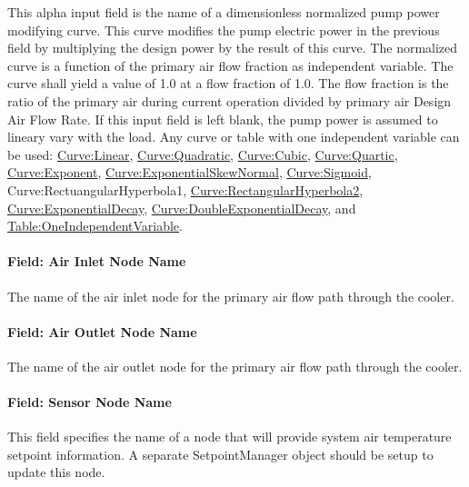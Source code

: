 This alpha input field is the name of a dimensionless normalized pump power modifying curve. This curve modifies the pump electric power in the previous field by multiplying the design power by the result of this curve. The normalized curve is a function of the primary air flow fraction as independent variable. The curve shall yield a value of 1.0 at a flow fraction of 1.0. The flow fraction is the ratio of the primary air during current operation divided by primary air Design Air Flow Rate. If this input field is left blank, the pump power is assumed to lineary vary with the load. Any curve or table with one independent variable can be used: \hyperref[curvelinear]{Curve:Linear}, \hyperref[curvequadratic]{Curve:Quadratic}, \hyperref[curvecubic]{Curve:Cubic}, \hyperref[curvequartic]{Curve:Quartic}, \hyperref[curveexponent]{Curve:Exponent}, \hyperref[curveexponentialskewnormal]{\hyperref[curveexponent]{Curve:Exponent}ialSkewNormal}, \hyperref[curvesigmoid]{Curve:Sigmoid}, Curve:RectuangularHyperbola1, \hyperref[curverectangularhyperbola2]{Curve:RectangularHyperbola2}, \hyperref[curveexponentialdecay]{\hyperref[curveexponent]{Curve:Exponent}ialDecay}, \hyperref[curvedoubleexponentialdecay]{Curve:DoubleExponentialDecay}, and \hyperref[tableoneindependentvariable]{Table:OneIndependentVariable}.

\paragraph{Field: Air Inlet Node Name}\label{field-air-inlet-node-name-1-001}

The name of the air inlet node for the primary air flow path through the cooler.

\paragraph{Field: Air Outlet Node Name}\label{field-air-outlet-node-name-1-000}

The name of the air outlet node for the primary air flow path through the cooler.

\paragraph{Field: Sensor Node Name}\label{field-sensor-node-name-001}

This field specifies the name of a node that will provide system air temperature setpoint information. A separate SetpointManager object should be setup to update this node.

